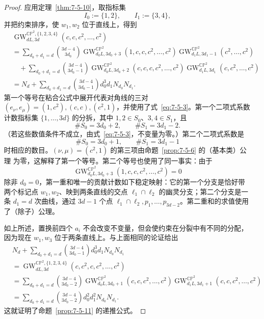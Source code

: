 \begin{proof}
应用定理~\ref{thm:7-5-10}，取指标集
\[
  I_0:=\{1,2\},\qquad I_1:=\{3,4\},
\]
并把约束排序，使 $w_1,w_2$ 位于直线上，得到
\begin{align*}
 &\operatorname{GW}_{dL,3d}^{\mathbb{CP}^2,\{1,2,3,4\}}
   (c,c,c^2,\ldots,c^2)\\
 &=\sum_{d_0+d_1=d}\binom{3d-4}{3d_0}
   \operatorname{GW}_{d_0L,3d_0+3}^{\mathbb{CP}^2}
     (1,c,c,c^2,\ldots,c^2)
   \operatorname{GW}_{d_1L,3d_1-1}^{\mathbb{CP}^2}
     (c^2,\ldots,c^2)\\
 &\quad+
   \sum_{d_0+d_1=d}\binom{3d-4}{3d_0-1}
   \operatorname{GW}_{d_0L,3d_0+2}^{\mathbb{CP}^2}
     (c,c,c,c^2,\ldots,c^2)
   \operatorname{GW}_{d_1L,3d_1}^{\mathbb{CP}^2}
     (c,c^2,\ldots,c^2)\\
 &=N_d+
   \sum_{d_0+d_1=d}\binom{3d-4}{3d_0-1}
     d_0^3d_1N_{d_0}N_{d_1}.
\end{align*}
第一个等号在粘合公式中展开代表对角线的三对
$(e_\nu,e_\mu)=(1,c^2),(c,c),(c^2,1)$，并使用了式~\eqref{eq:7-5-3}。第一个二项式系数
计数指标集 $\{1,\ldots,3d\}$ 的分拆，其中
$1,2\in S_0$、$3,4\in S_1$，且
\[
  \#S_0=3d_0+2,\qquad \#S_1=3d_1-2.
\]
（若这些数值条件不成立，由式~\eqref{eq:7-5-3}，不变量为零。）第二个二项式系数是
\[
  \#S_0=3d_0+1,\qquad \#S_1=3d_1-1
\]
时相应的数目。$(\nu,\mu)=(c^2,1)$ 的第三项由命题~\ref{prop:7-5-6} 的（基本类）公理
为零，这解释了第一个等号。第二个等号也使用了同一事实：由于
\[
  \operatorname{GW}_{d_0L,3d_0+3}^{\mathbb{CP}^2}
  (1,c,c,c^2,\ldots,c^2)=0
\]
除非 $d_0=0$，第一重和唯一的贡献计数如下稳定映射：它的第一个分支是恰好带两个标记点
$w_1,w_2$、映到两条直线的交点 $\ell_1\cap\ell_2$ 的幽灵分支；第二个分支是一条
$d_1=d$ 次曲线，通过 $3d-1$ 个点
$\ell_1\cap\ell_2,p_1,\ldots,p_{3d-2}$。第二重和的求值使用了（除子）公理。

如上所述，置换前四个 $a_i$ 不会改变不变量，但会使约束在分裂中有不同的分配，因为现在
$w_1,w_3$ 位于两条直线上。与上面相同的论证给出
\begin{align*}
  &N_d+
   \sum_{d_0+d_1=d}\binom{3d-4}{3d_0-1}
      d_0^3d_1N_{d_0}N_{d_1}\\
  &=\operatorname{GW}_{dL,3d}^{\mathbb{CP}^2,\{1,2,3,4\}}
      (c,c^2,c,c^2,\ldots,c^2)\\
  &=\sum_{d_0+d_1=d}\binom{3d-4}{3d_0-2}
    \operatorname{GW}_{d_0L,3d_0+1}^{\mathbb{CP}^2}
      (c,c,c^2,\ldots,c^2)
    \operatorname{GW}_{d_1L,3d_1+1}^{\mathbb{CP}^2}
      (c,c,c^2,\ldots,c^2)\\
  &=\sum_{d_0+d_1=d}\binom{3d-4}{3d_0-2}
      d_0^2d_1^2N_{d_0}N_{d_1}.
\end{align*}
这就证明了命题~\ref{prop:7-5-11} 的递推公式。
\end{proof}


